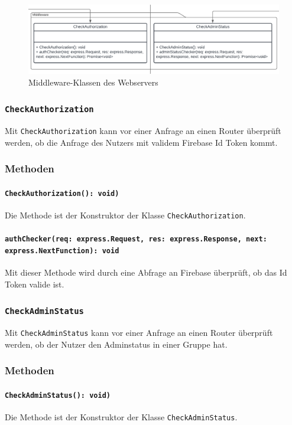 \documentclass{entwurfsheft}
\begin{document}
\begin{figure}[htp]
    \centering
    \includegraphics[width = 1\textwidth]{images/webserver/middleware.pdf}
    \caption{Middleware-Klassen des Webservers}
    \label{fig:middleware}
\end{figure}

\subsubsection{\texttt{CheckAuthorization}}\label{sec:CheckAuthorization}
Mit \texttt{CheckAuthorization} kann vor einer Anfrage an einen Router überprüft werden, ob die Anfrage des Nutzers mit validem Firebase Id Token kommt. %
\subsubsection*{Methoden}
\paragraph{\texttt{CheckAuthorization(): void)}}
Die Methode ist der Konstruktor der Klasse \texttt{CheckAuthorization}.
\paragraph{\texttt{authChecker(req: express.Request, res: express.Response, next: express.NextFunction): void}}
Mit dieser Methode wird durch eine Abfrage an Firebase überprüft, ob das Id Token valide ist.

\subsubsection{\texttt{CheckAdminStatus}}\label{sec:CheckAdminStatus}
Mit \texttt{CheckAdminStatus} kann vor einer Anfrage an einen Router überprüft werden, ob der Nutzer den Adminstatus in einer Gruppe hat.
\subsubsection*{Methoden}
\paragraph{\texttt{CheckAdminStatus(): void)}}
Die Methode ist der Konstruktor der Klasse \texttt{CheckAdminStatus}.
\end{document}
